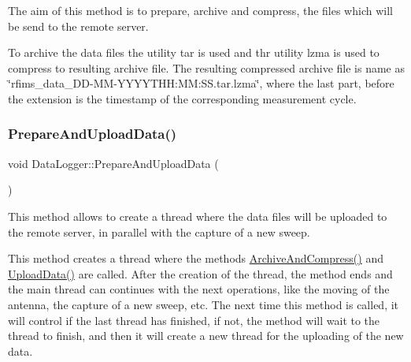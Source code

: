 The aim of this method is to prepare, archive and compress, the files which will be send to the remote server. 

To archive the data files the utility \textquotesingle{}tar\textquotesingle{} is used and thr utility \textquotesingle{}lzma\textquotesingle{} is used to compress to resulting archive file. The resulting compressed archive file is name as \char`\"{}rfims\+\_\+data\+\_\+\+D\+D-\/\+M\+M-\/\+Y\+Y\+Y\+Y\+T\+H\+H\+:\+M\+M\+:\+S\+S.\+tar.\+lzma\char`\"{}, where the last part, before the extension is the timestamp of the corresponding measurement cycle. \mbox{\label{classDataLogger_a98ea7aaa941bbddea8069415e1652759}} 
\subsubsection{\texorpdfstring{Prepare\+And\+Upload\+Data()}{PrepareAndUploadData()}}
{\footnotesize\ttfamily void Data\+Logger\+::\+Prepare\+And\+Upload\+Data (\begin{DoxyParamCaption}{ }\end{DoxyParamCaption})}



This method allows to create a thread where the data files will be uploaded to the remote server, in parallel with the capture of a new sweep. 

This method creates a thread where the methods {\ttfamily \hyperlink{classDataLogger_a147fb7eaee1c38bbf57ef2d6cddf70d5}{Archive\+And\+Compress()}} and {\ttfamily \hyperlink{classDataLogger_ab58f4cc05f738ef757c884fe9ef131eb}{Upload\+Data()}} are called. After the creation of the thread, the method ends and the main thread can continues with the next operations, like the moving of the antenna, the capture of a new sweep, etc. The next time this method is called, it will control if the last thread has finished, if not, the method will wait to the thread to finish, and then it will create a new thread for the uploading of the new data. \mbox{\label{classDataLogger_a2ffe9fb45883c2880e1c45a4406fc22b}} 
